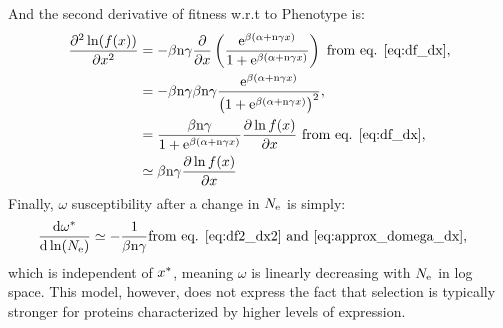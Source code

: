 And the second derivative of fitness w.r.t to \gls{Phenotype} is:
\begin{align}
\frac{\partial^2 \ln (f(x))}{\partial x^2} & = - \beta \text{n} \gamma \frac{\partial}{\partial x} \left( \frac{\mathrm{e}^{\beta(\alpha + \text{n} \gamma x)}}{1 + \mathrm{e}^{\beta(\alpha + \text{n} \gamma x)}} \right) \text{ from eq. \ref{eq:df_dx}}, \\
 & = - \beta \text{n} \gamma  \beta \text{n} \gamma \frac{\mathrm{e}^{\beta(\alpha + \text{n} \gamma x)}}{\left( 1 + \mathrm{e}^{\beta(\alpha + \text{n} \gamma x)}\right)^2}, \\
 & = \frac{\beta \text{n} \gamma}{1 + \mathrm{e}^{\beta(\alpha + \text{n} \gamma x)}} \frac{ \partial \ln f(x) }{\partial x} \text{ from eq. \ref{eq:df_dx}} \label{eq:df2_dx2}, \\
 & \simeq \beta \text{n} \gamma \frac{ \partial \ln f(x) }{\partial x} 
\end{align}
Finally, $\omega$ susceptibility after a change in $N_{\mathrm{e}}$ is simply:
\begin{align}
\frac{ \mathrm{d} \omega^{*}}{\mathrm{d} \ln (N_{\mathrm{e}})} & \simeq - \frac{1}{\beta \text{n} \gamma} \text{from eq. \ref{eq:df2_dx2} and \ref{eq:approx_domega_dx}},
\end{align}
which is independent of $x^{*}$, meaning $\omega$ is linearly decreasing with $N_{\mathrm{e}}$ in log space.
This model, however, does not express the fact that selection is typically stronger for proteins characterized by higher levels of expression. 
